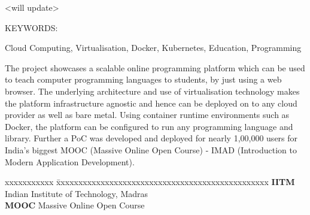 \documentclass[DD]{iitmdiss}
\begin{document}
\acknowledgements

<will update>


\abstract

\noindent KEYWORDS: \hspace*{0.5em} \parbox[t]{4.4in}{Cloud Computing, Virtualisation, Docker, Kubernetes, Education, Programming}

\vspace*{24pt}

\noindent The project showcases a scalable online programming platform which can be used to teach computer programming languages to students, by just using a web browser. The underlying architecture and use of virtualisation technology makes the platform infrastructure agnostic and hence can be deployed on to any cloud provider as well as bare metal. Using container runtime environments such as Docker, the platform can be configured to run any programming language and library. Further a PoC was developed and deployed for nearly 1,00,000 users for India's biggest MOOC (Massive Online Open Course) - IMAD (Introduction to Modern Application Development).

\pagebreak


\begin{singlespace}
\tableofcontents
\thispagestyle{empty}

\listoftables
{}
\listoffigures
{}
\end{singlespace}


\abbreviations

\noindent 
\begin{tabbing}
xxxxxxxxxxx \= xxxxxxxxxxxxxxxxxxxxxxxxxxxxxxxxxxxxxxxxxxxxxxxx \kill
\textbf{IITM}   \> Indian Institute of Technology, Madras \\
\textbf{MOOC} \> Massive Online Open Course \\
\end{tabbing}

\pagebreak

\end{document}
